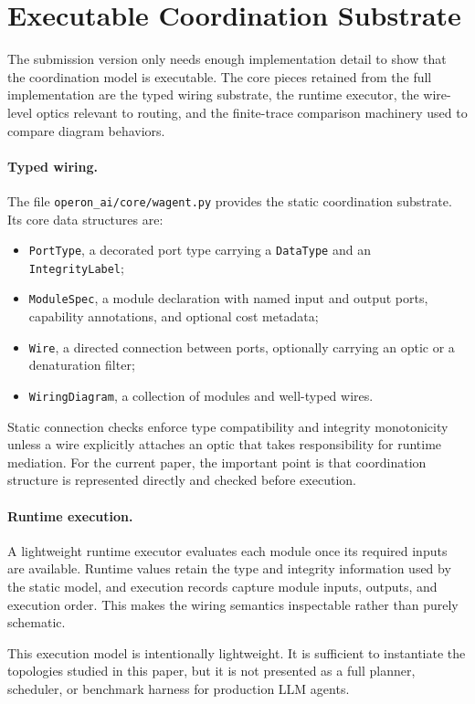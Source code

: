 \section{Executable Coordination Substrate}

The submission version only needs enough implementation detail to show that the coordination model is
executable. The core pieces retained from the full implementation are the typed wiring substrate, the
runtime executor, the wire-level optics relevant to routing, and the finite-trace comparison machinery
used to compare diagram behaviors.

\paragraph{Typed wiring.}
The file \texttt{operon\_ai/core/wagent.py} provides the static coordination substrate. Its core data
structures are:
\begin{itemize}[leftmargin=*]
\item \texttt{PortType}, a decorated port type carrying a \texttt{DataType} and an
\texttt{IntegrityLabel};
\item \texttt{ModuleSpec}, a module declaration with named input and output ports, capability
annotations, and optional cost metadata;
\item \texttt{Wire}, a directed connection between ports, optionally carrying an optic or a denaturation
filter;
\item \texttt{WiringDiagram}, a collection of modules and well-typed wires.
\end{itemize}
Static connection checks enforce type compatibility and integrity monotonicity unless a wire explicitly
attaches an optic that takes responsibility for runtime mediation. For the current paper, the important
point is that coordination structure is represented directly and checked before execution.

\paragraph{Runtime execution.}
A lightweight runtime executor evaluates each module once its required inputs are available. Runtime
values retain the type and integrity information used by the static model, and execution records capture
module inputs, outputs, and execution order. This makes the wiring semantics inspectable rather than
purely schematic.

This execution model is intentionally lightweight. It is sufficient to instantiate the topologies studied
in this paper, but it is not presented as a full planner, scheduler, or benchmark harness for production
LLM agents.

